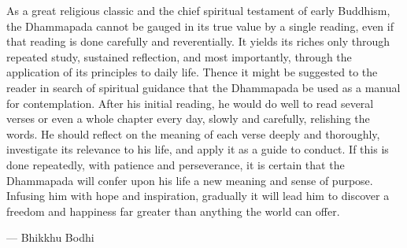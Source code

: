 As a great religious classic and the chief spiritual testament of early Buddhism, the Dhammapada cannot be gauged in its true value by a single reading, even if that reading is done carefully and reverentially. It yields its riches only through repeated study, sustained reflection, and most importantly, through the application of its principles to daily life. Thence it might be suggested to the reader in search of spiritual guidance that the Dhammapada be used as a manual for contemplation. After his initial reading, he would do well to read several verses or even a whole chapter every day, slowly and carefully, relishing the words. He should reflect on the meaning of each verse deeply and thoroughly, investigate its relevance to his life, and apply it as a guide to conduct. If this is done repeatedly, with patience and perseverance, it is certain that the Dhammapada will confer upon his life a new meaning and sense of purpose. Infusing him with hope and inspiration, gradually it will lead him to discover a freedom and happiness far greater than anything the world can offer.

— Bhikkhu Bodhi
